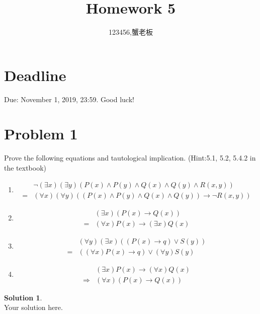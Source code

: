\documentclass[a4paper,UTF8]{article}
\theoremstyle{definition}
\newtheorem*{solution}{Solution}
\begin{document}
\title{Homework 5}
\author{123456,蟹老板}
\maketitle


\section*{Deadline}
Due: November 1, 2019, 23:59. Good luck!

\section*{Problem 1}
Prove the following equations and tautological implication. (Hint:5.1, 5.2, 5.4.2 in the textbook)
\begin{enumerate}
\item
\begin{align*}
&\neg(\exists x)(\exists y)( P(x)\wedge P(y)\wedge Q(x)\wedge Q(y)\wedge R(x,y) )\\
=&(\forall x)(\forall y)( ( P(x)\wedge P(y)\wedge Q(x)\wedge Q(y) )\rightarrow \neg R(x,y) )
\end{align*}
\item
\begin{align*}
&(\exists x)( P(x)\rightarrow Q(x) )\\
=&(\forall x)P(x)\rightarrow (\exists x)Q(x)
\end{align*}
\item
\begin{align*}
&(\forall y)(\exists x)( (P(x)\rightarrow q)\vee S(y) )\\
=&(( \forall x )P(x)\rightarrow q )\vee(\forall y)S(y)
\end{align*}
\item
\begin{align*}
&(\exists x)P(x)\rightarrow (\forall x)Q(x)\\
\Rightarrow&(\forall x)( P(x)\rightarrow Q(x) )
\end{align*}
\end{enumerate}
\begin{solution}
~\\
Your solution here.
\end{solution}
\end{document}
